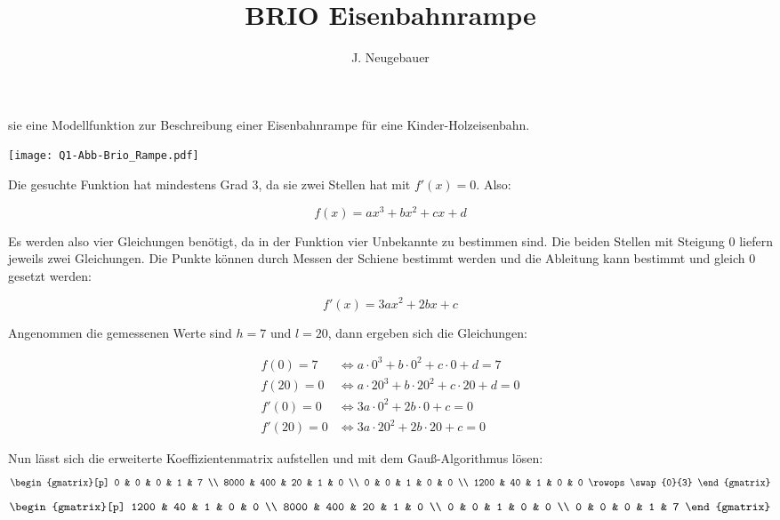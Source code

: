 \documentclass[11pt, a4paper]{scrartcl}
\author{J. Neugebauer}
\title{BRIO Eisenbahnrampe}
\date{\Heute}
\begin{document}
	\TITEL
	
	\begin{aufgabe}
		 sie eine Modellfunktion zur Beschreibung einer Eisenbahnrampe für eine Kinder-Holzeisenbahn.
		
		\texttt{[image: Q1-Abb-Brio\_Rampe.pdf]}
		
		\begin{loesung}
			Die gesuchte Funktion hat mindestens Grad 3, da sie zwei Stellen hat mit $f'(x) = 0$. Also:
			
			\[ f(x) = ax^3 + bx^2 + cx + d \]
			
			Es werden also vier Gleichungen benötigt, da in der Funktion vier Unbekannte zu bestimmen sind. Die beiden Stellen mit Steigung $0$ liefern jeweils zwei Gleichungen. Die Punkte können durch Messen der Schiene bestimmt werden und die Ableitung kann bestimmt und gleich $0$ gesetzt werden:
			
			\[ f'(x) = 3ax^2 + 2bx + c \]
			
			Angenommen die gemessenen Werte sind $h = 7$ und $l = 20$, dann ergeben sich die Gleichungen:
			 
			\begin{align*}
				f(0) = 7 &\Leftrightarrow a\cdot 0^3 + b\cdot 0^2 + c\cdot 0 + d = 7 \\
				f(20) = 0 &\Leftrightarrow a\cdot 20^3 + b\cdot 20^2 + c\cdot 20 + d = 0 \\
				f'(0) = 0 &\Leftrightarrow 3a\cdot 0^2 + 2b\cdot 0 + c = 0 \\
				f'(20) = 0 &\Leftrightarrow 3a\cdot 20^2 + 2b\cdot 20 + c = 0
			\end{align*}
			
			Nun lässt sich die erweiterte Koeffizientenmatrix aufstellen und mit dem Gauß-Algorithmus lösen:
			\[ \begin{gmatrix}[p]
			0 & 0 & 0 & 1 & 7 \\ 
			8000 & 400 & 20 & 1 & 0 \\
			0 & 0 & 1 & 0 & 0 \\
			1200 & 40 & 1 & 0 & 0
			\rowops
			\swap{0}{3}
			\end{gmatrix} \]
			\[ \begin{gmatrix}[p]
			1200 & 40 & 1 & 0 & 0 \\
			8000 & 400 & 20 & 1 & 0 \\
			0 & 0 & 1 & 0 & 0 \\
			0 & 0 & 0 & 1 & 7
			\end{gmatrix} \]
			

\end{loesung}
\end{aufgabe}
\end{document}
